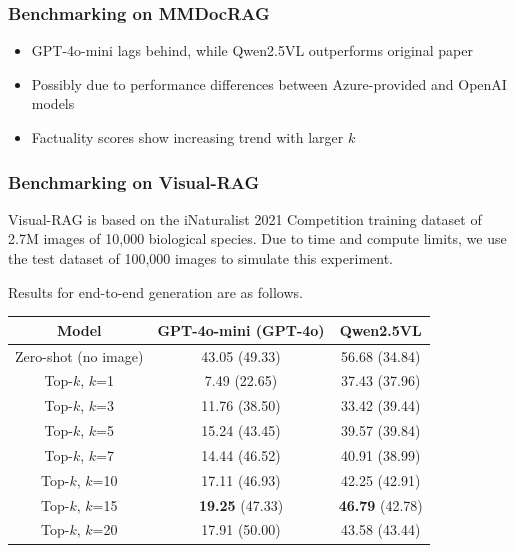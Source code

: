 \documentclass[aspectratio=1610]{beamer}
\begin{document}
    \begin{frame}
        \frametitle{Benchmarking on MMDocRAG}
        \begin{itemize}
            \item GPT-4o-mini lags behind, while Qwen2.5VL outperforms original paper
            \item Possibly due to performance differences between Azure-provided and OpenAI models
            \item Factuality scores show increasing trend with larger $k$
        \end{itemize}
    \end{frame}

    \begin{frame}
        \frametitle{Benchmarking on Visual-RAG}
        Visual-RAG is based on the iNaturalist 2021 Competition training dataset of 2.7M images of 10,000 biological species.
        Due to time and compute limits, we use the test dataset of 100,000 images to simulate this experiment.

        Results for end-to-end generation are as follows.
        \begin{tabularx}{\textwidth}{@{} c | c c @{}}
            \toprule
            Model & GPT-4o-mini (GPT-4o) & Qwen2.5VL \\
            \midrule
            \endhead
            Zero-shot (no image) & 43.05 (49.33) & 56.68 (34.84) \\
            \midrule
            Top-$k$, $k$=1 & 7.49 (22.65) & 37.43 (37.96) \\
            Top-$k$, $k$=3 & 11.76 (38.50) & 33.42 (39.44) \\
            Top-$k$, $k$=5 & 15.24 (43.45) & 39.57 (39.84) \\
            Top-$k$, $k$=7 & 14.44 (46.52) & 40.91 (38.99) \\
            Top-$k$, $k$=10 & 17.11 (46.93) & 42.25 (42.91) \\
            Top-$k$, $k$=15 & \textbf{19.25} (47.33) & \textbf{46.79} (42.78) \\
            Top-$k$, $k$=20 & 17.91 (50.00) & 43.58 (43.44) \\
            \bottomrule
        \end{tabularx}
    \end{frame}
\end{document}
